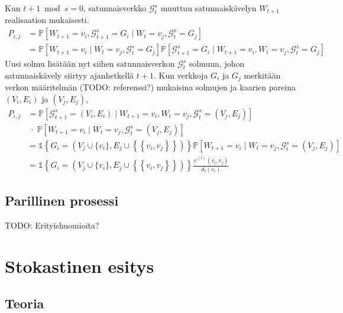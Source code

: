 \documentclass[finnish, 12pt, a4paper, sci, utf8, pdfa]{aaltothesis}
\newcommand{\indicator}{\mathopen{\mathds{1}}}
\newcommand*{\prob}{\mathbb{P}}
\begin{document}
\vspace{1cm}

Kun $ t + 1 \bmod s = 0 $, satunnaisverkko $ \mathcal{G}^{s}_{t} $ muuttuu satunnaiskävelyn $ W_{t+1} $ realisaation mukaisesti.
\begin{align*}
   P_{i,j} &= \prob \left[ W_{t+1} = v_{i}, \mathcal{G}^{s}_{t+1} = G_{i} \mid W_{t} = v_{j}, \mathcal{G}^{s}_{t} = G_{j} \right] \\
   \quad &= \prob \left[ W_{t+1} = v_{i} \mid W_{t} = v_{j}, \mathcal{G}^{s}_{t} = G_{j} \right] \prob \left[ \mathcal{G}^{s}_{t+1} = G_{i} \mid W_{t+1} = v_{i}, W_{t} = v_{j}, \mathcal{G}^{s}_{t} = G_{j} \right]
\end{align*}
Uusi solmu lisätään nyt siihen satunnaisverkon $ \mathcal{G}^{s}_{t} $ solmuun, johon satunnaiskävely siirtyy ajanhetkellä $ t + 1 $. Kun verkkoja $ G_{i} $ ja $ G_{j} $ merkitään verkon määritelmän (TODO: referenssi?) mukaisina solmujen ja kaarien pareina $ (V_{i}, E_{i}) $ ja $ (V_{j}, E_{j}) $,
\begin{align*}
   P_{i,j} &= \prob \left[ \mathcal{G}^{s}_{t+1} = (V_{i}, E_{i}) \mid W_{t+1} = v_{i}, W_{t} = v_{j}, \mathcal{G}^{s}_{t} = (V_{j}, E_{j}) \right] \\
           & \; \cdot \; \prob \left[ W_{t+1} = v_{i} \mid W_{t} = v_{j}, \mathcal{G}^{s}_{t} = (V_{j}, E_{j}) \right] \\
           &= \indicator \left\{ G_{i} = (V_{j} \cup \{ v_{i} \}, E_{j} \cup \left\{ \left\{ v_{i}, v_{j} \right\} \right\}) \right\} \prob \left[ W_{t+1} = v_{i} \mid W_{t} = v_{j}, \mathcal{G}^{s}_{t} = (V_{j}, E_{j}) \right] \\
           &= \indicator \left\{ G_{i} = (V_{j} \cup \{ v_{i} \}, E_{j} \cup \left\{ \left\{ v_{i}, v_{j} \right\} \right\}) \right\} \frac{\psi^{(t)}(v_{i}, v_{j})}{d_{t}(v_{i})}
\end{align*}

\subsection{Parillinen prosessi}

TODO: Erityishuomioita?

\section{Stokastinen esitys}

\subsection{Teoria}
\end{document}

